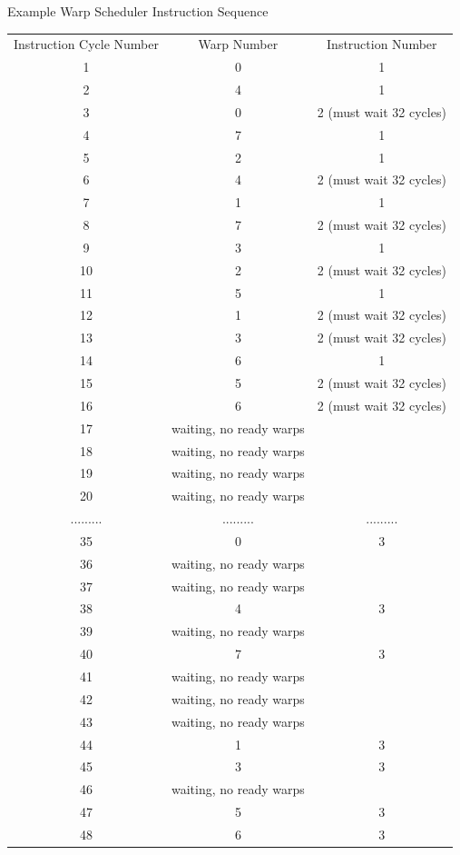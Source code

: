 \begin{center}
Example Warp Scheduler Instruction Sequence
\begin{tabular}{ c c c}
 Instruction Cycle Number & Warp Number & Instruction Number\\ 
 1 & 0 & 1 \\  
 2 & 4 & 1 \\
 3 & 0 & 2 (must wait 32 cycles) \\
 4 & 7 & 1 \\
 5 & 2 & 1 \\
 6 & 4 & 2 (must wait 32 cycles) \\
 7 & 1 & 1 \\
 8 & 7 & 2 (must wait 32 cycles) \\
 9 & 3 & 1 \\
 10 & 2 & 2 (must wait 32 cycles) \\
 11 & 5 & 1 \\
 12 & 1 & 2 (must wait 32 cycles) \\
 13 & 3 & 2 (must wait 32 cycles) \\
 14 & 6 & 1 \\
 15 & 5 & 2 (must wait 32 cycles) \\
 16 & 6 & 2 (must wait 32 cycles) \\
 17 & waiting, no ready warps & \\
 18 & waiting, no ready warps & \\
 19 & waiting, no ready warps & \\
 20 & waiting, no ready warps & \\
 ......... & ......... & ......... \\
 35 & 0 & 3 \\
 36 & waiting, no ready warps & \\
 37 & waiting, no ready warps & \\
 38 & 4 & 3 \\
 39 & waiting, no ready warps & \\
 40 & 7 & 3 \\
 41 & waiting, no ready warps & \\
 42 & waiting, no ready warps & \\
 43 & waiting, no ready warps & \\
 44 & 1 & 3 \\
 45 & 3 & 3 \\
 46 & waiting, no ready warps & \\
 47 & 5 & 3 \\
 48 & 6 & 3
\end{tabular}
\end{center}

